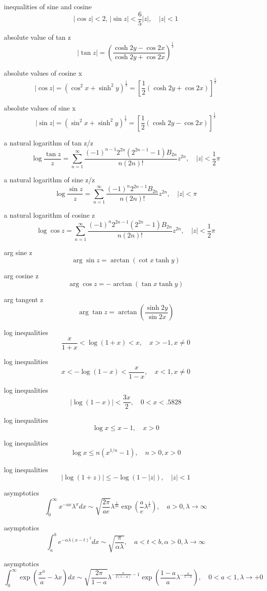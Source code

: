 inequalities of sine and cosine
$$
|\cos z|<2, \, |\sin z|<\frac{6}{5}|z|, \quad |z|<1
$$

absolute value of tan z 
$$
|\tan z|=\left(\frac{\cosh 2y-\cos 2x}{\cosh 2y+\cos 2x}\right)^{\frac{1}{2}}
$$

absolute values of cosine x
$$
|\cos z|=(\cos^2 x+\sinh^2 y)^{\frac{1}{2}}=\left[\frac{1}{2}(\cosh 2y+\cos 2x)\right]^{\frac{1}{2}}
$$

absolute values of sine x
$$
|\sin z|=(\sin^2 x+\sinh^2 y)^{\frac{1}{2}}=\left[\frac{1}{2}(\cosh 2y-\cos 2x)\right]^{\frac{1}{2}}
$$

a natural logarithm of tan z/z
$$
\log \frac{\tan z}{z}=\sum^\infty_{n=1} \frac{(-1)^{n-1}2^{2n}\left(2^{2n-1}-1\right)B_{2n}}{n(2n)!}z^{2n},\quad |z|<\frac{1}{2}\pi
$$

a natural logarithm of sine z/z
$$
\log \frac{\sin z}{z}=\sum^\infty_{n=1} \frac{(-1)^{n}2^{2n-1}B_{2n}}{n(2n)!}z^{2n},\quad |z|<\pi
$$


a natural logarithm of cosine z 
$$
\log \cos z=\sum^\infty_{n=1} \frac{(-1)^{n}2^{2n-1}\left(2^{2n}-1\right)B_{2n}}{n(2n)!}z^{2n},\quad |z|<\frac{1}{2}\pi
$$

arg sine z
$$
\arg \sin z=\arctan (\cot x \tanh y)
$$


arg cosine z
$$
\arg \cos z = -\arctan (\tan x \tanh y)
$$

arg tangent z
$$
\arg \tan z = \arctan \left(\frac{\sinh 2y}{\sin 2x} \right)
$$

log inequalities 
$$
\frac{x}{1+x}<\log(1+x)<x,\quad x>-1,x \ne 0
$$

log inequalities
$$
x<-\log (1-x)<\frac{x}{1-x},\quad x<1,x\ne 0
$$

log inequalities
$$
|\log(1-x)|<\frac{3x}{2}, \quad 0<x<.5828
$$

log inequalities
$$
\log x \le x-1, \quad x>0
$$

log inequalities
$$
\log x \le n(x^{1/n}-1), \quad n>0, x>0
$$

log inequalities
$$
|\log(1+z)| \le -\log(1-|z|), \quad |z|<1
$$

asymptotics
$$
\int^\infty_0 x^{-ax}\lambda^x dx \sim \sqrt{\frac{2\pi}{ae}}\lambda^{\frac{1}{2a}}\exp\left(\frac{a}{e}\lambda^{\frac{1}{a}}\right), \quad a>0,\lambda\rightarrow\infty
$$

asymptotics
$$
\int^b_a e^{-\alpha \lambda(x-t)^2}dx \sim \sqrt{\frac{\pi}{\alpha \lambda}}, \quad a<t<b,\alpha>0,\lambda\rightarrow\infty
$$

asymptotics
$$
\int^\infty_0\exp\left(\frac{x^a}{a}-\lambda x\right)dx \sim \sqrt{\frac{2\pi}{1-a}}\lambda^{-\frac{a}{2(1-a)}-1}\exp\left(\frac{1-a}{a}\lambda^{-\frac{a}{1-a}}\right),\quad 0<a<1,\lambda\rightarrow+0
$$

